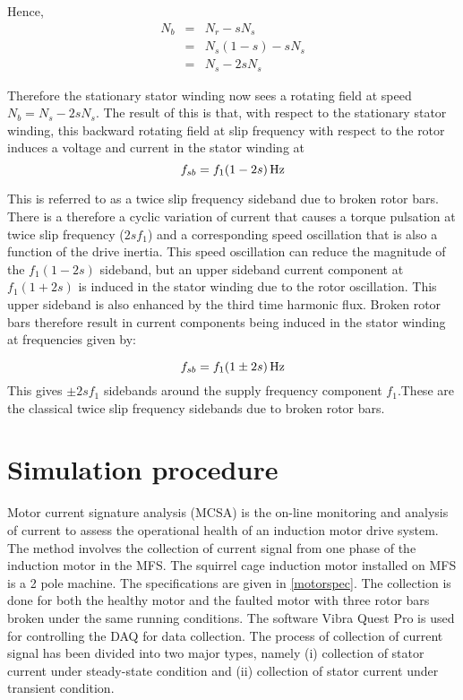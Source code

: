 \documentclass[a4paper,11pt]{report}
\begin{document}
Hence,
\begin{eqnarray}
N_{b} & = &N_{r} - sN_{s}  \nonumber \\
 &=& N_{s}(1-s) - sN_{s}  \nonumber \\
 &=& N_{s} - 2sN_{s}  
\end{eqnarray}

Therefore the stationary stator winding now sees a rotating field at speed $N_{b} = N_{s} - 2sN_{s}$. The result of this is that, with respect to the stationary stator winding, this backward rotating field at slip frequency with respect to the rotor induces a voltage and current in the stator winding at
\begin{equation}
f_{sb}=\unit[f_{1}(1-2s)]{Hz}
\end{equation}

This is referred to as a twice slip frequency sideband due to broken rotor bars. There is a therefore a cyclic variation of current that causes a torque pulsation at twice slip frequency ($2sf_{1}$) and a corresponding speed oscillation that is also a function of the drive inertia. This speed oscillation can reduce the magnitude of the $f_{1}(1-2s)$ sideband, but an upper sideband current component at $f_{1}(1+2s)$ is induced in the stator winding due to the rotor oscillation. This upper sideband is also enhanced by the third time harmonic flux. Broken rotor bars therefore result in current components being induced in the stator winding at frequencies given by:

\begin{equation}
f_{sb}=\unit[f_{1}(1\pm2s)]{Hz} \label{sb}
\end{equation}
This gives $\pm2sf_{1}$ sidebands around the supply frequency component $f_{1}$.These are the classical twice slip frequency sidebands due to broken rotor bars.

\section{Simulation procedure}
Motor current signature analysis (MCSA) is the on-line monitoring and analysis of current to assess the operational health of an induction motor drive system. The method involves the collection of current signal from one phase of the induction motor in the MFS. The squirrel cage induction motor installed on MFS is a 2 pole machine. The specifications are given in \ref{motorspec}. The collection is done for both the healthy motor and the faulted motor with three rotor bars broken under the same running conditions. The software Vibra Quest Pro is used for controlling the DAQ for data collection. The process of collection of current signal has been divided into two major types, namely (i) collection of stator current under steady-state condition and (ii) collection of stator current under transient condition.
 
\end{document}
